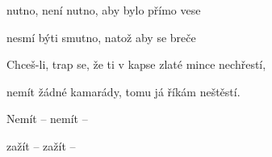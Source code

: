 

\zr
{} nutno, není nutno, aby bylo přímo vese

 nesmí býti smutno, natož aby se breče 
\kr

\zs
Chceš-li, trap se, že ti v kapse zlaté mince nechřestí,

nemít žádné kamarády, tomu já říkám neštěstí.
\ks

\zs
Nemít  --  nemít  -- 

zažít  --  zažít  --  
\ks


\zr \kr

\zr \kr

\kp





